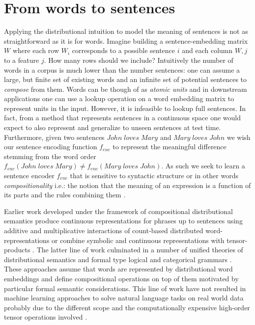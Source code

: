 \section{From words to sentences}
\label{sec:sentences}
Applying the distributional intuition to model the meaning of sentences is not as straightforward
as it is for words.
Imagine building a sentence-embedding matrix $W$ where each row $W_i$ corresponds to
a possible sentence $i$ and each column $W,j$ to a feature $j$.
How many rows should we include? Intuitively the number of words in a corpus is much
lower than the number sentences: one can assume a large, but finite set
of existing words and an infinite set of
potential sentences to \emph{compose} from them.
Words can be though of as \emph{atomic units} and
in downstream applications one can use a lookup operation on a word embedding matrix
to represent units in the input. However, it is infeasible to lookup full sentences.
In fact, from a method that represents sentences in a continuous space one would expect
to also represent and generalize to unseen sentences at test time.
Furthermore, given two sentences $\mathit{John \; loves \; Mary}$ and
$\mathit{Mary \; loves \; John}$ we wish our sentence encoding function
$f_{enc}$ to represent the meaningful difference stemming from the word order
$f_{enc}(\mathit{John \; loves \; Mary}) \neq f_{enc}(\mathit{Mary \; loves \; John})$.
As such we seek to learn a sentence encoder $f_{enc}$ that is sensitive to
syntactic structure or in other words \emph{compositionality} i.e.:
the notion that the meaning of an expression is
a function of its parts and the rules combining them \citep{montague1970english}.

Earlier work developed under the framework of compositional distributional semantics produce
continuous representations for phrases up to sentences using additive and multiplicative interactions
of count-based distributed word-representations \citep{mitchell2008vector} or combine symbolic and
continuous representations with tensor-products \citep{clark2007combining}.
The latter line of work culminated in a number of unified theories of
distributional semantics and formal type logical and categorical grammars
\citep{coecke2010mathematical,clarke2012context,baroni2014frege}.
These approaches assume that words are represented by distributional word embeddings
and define compositional operations on top of them motivated by particular formal
semantic considerations. This line of work have not resulted in
machine learning approaches to solve natural language tasks
on real world data probably due to the different scope and
the computationally expensive high-order
tensor operations involved \citep{bowman2016modeling}.

